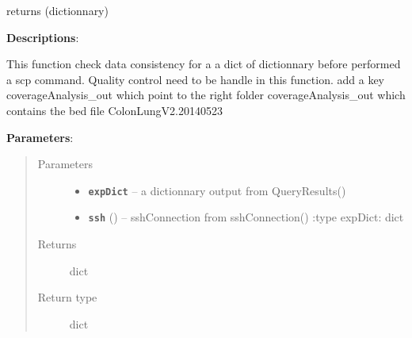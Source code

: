 \documentclass[letterpaper,10pt,english]{sphinxmanual}
\begin{document}
\begin{fulllineitems}
\label{datamanagerpkg:datamanagerpkg.ProtonCommunication_data_manager.CheckResultsConsistency}
returns (dictionnary)

\textbf{Descriptions}:

This function  check data consistency for a a dict of dictionnary before performed a scp command.
Quality control need to be handle in this function. add a key coverageAnalysis\_out
which point to the right folder coverageAnalysis\_out which contains the bed file ColonLungV2.20140523

\textbf{Parameters}:
\begin{quote}\begin{description}
\item[{Parameters}] \leavevmode\begin{itemize}
\item {} 
\textbf{\texttt{expDict}} -- a dictionnary output from QueryResults()

\item {} 
\textbf{\texttt{ssh}} ({\hyperref[datamanagerpkg:datamanagerpkg.ProtonCommunication_data_manager.sshConnection]{}}) -- sshConnection from sshConnection()
:type expDict: dict

\end{itemize}

\item[{Returns}] \leavevmode
dict

\item[{Return type}] \leavevmode
dict

\end{description}\end{quote}

\end{fulllineitems}

\end{document}
